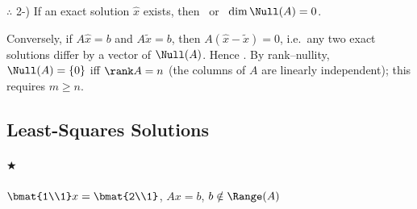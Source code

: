 \begin{keybox}
$\therefore$ 2-) If an exact solution $\hat x$ exists, then  \ or \ $\dim\Null(A) = 0$.
\end{keybox}
\begin{insight}
Conversely, if $A\hat x = b$ and $A\tilde x = b$, then $A(\hat x-\tilde x) = 0$, i.e.\ any two exact solutions
differ by a vector of $\Null(A)$. Hence . By rank--nullity, $\Null(A)=\{0\}$ iff $\rank A = n$ (the columns of $A$ are
linearly independent); this requires $m\ge n$.
\end{insight}

\subsection{Least-Squares Solutions}\label{ss:least-squares}
\paragraph{$\bigstar$} $\displaystyle \bmat{1\\1}x = \bmat{2\\1}$, \qquad $Ax = b$, \qquad $b\notin\Range(A)$

